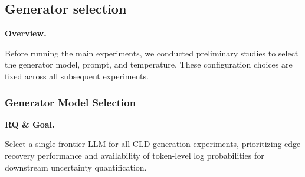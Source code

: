 \begingroup
\setlength{\leftskip}{1.25em}
\setlength{\parindent}{0pt}
\setlength{\parskip}{2pt}
\makeatletter
\renewcommand{\paragraph}[1]{\par\noindent\textbf{#1}\par\noindent}
\renewcommand{\subparagraph}[1]{\par\noindent\textbf{#1}\par\noindent}
\makeatother

\subsection{Generator selection}
\label{sec:preliminary_studies}

\paragraph{Overview.}
Before running the main experiments, we conducted preliminary studies to select the generator model, prompt, and temperature. These configuration choices are fixed across all subsequent experiments.

\subsubsection{Generator Model Selection}

\paragraph{RQ \& Goal.}
Select a single frontier LLM for all CLD generation experiments, prioritizing edge recovery performance and availability of token-level log probabilities for downstream uncertainty quantification.

